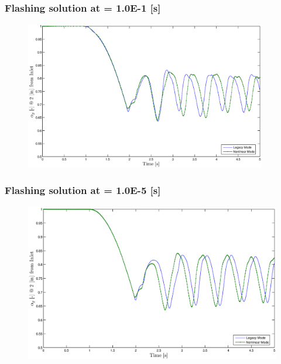 \documentclass[compress,xcolor=table]{beamer}
\begin{document}
\begin{frame}
\frametitle{Flashing solution at \dtmax{} = 1.0E-1 {[s]}}

\begin{figure}[h!t]
\centering
\includegraphics[width=0.94\textwidth]{images/flashing_1em1.eps}
\end{figure}

\end{frame}
\begin{frame}
\frametitle{Flashing solution at \dtmax{} = 1.0E-5 {[s]}}

\begin{figure}[h!t]
\centering
\includegraphics[width=.94\textwidth]{images/flashing_1em5.eps}
\end{figure}

\end{frame}
\end{document}
